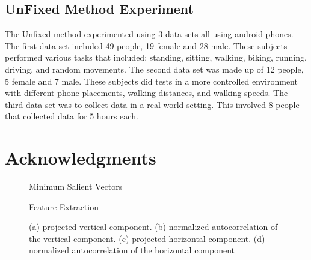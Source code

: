 \documentclass{sig-alternate}
\begin{document}
\subsection{UnFixed Method Experiment}
	The Unfixed method experimented using 3 data sets all using android phones. The first data set included 49 people, 19 female and 28 male. These subjects performed various tasks that included: standing, sitting, walking, biking, running, driving, and random movements. The second data set was made up of 12 people, 5 female and 7 male. These subjects did tests in a more controlled environment with different phone placements, walking distances, and walking speeds. The third data set was to collect data in a real-world setting. This involved 8 people that collected data for 5 hours each. 
\section{Acknowledgments}



  



\begin{figure*}
\centering
{}
\caption{Minimum Salient Vectors}
\label{fig:AccelChart}
\end{figure*}

\begin{figure}
\centering
{}
\caption{Feature Extraction}
\label{fig:SecondStep}
\end{figure}

\begin{figure}
\centering
{}
\caption{(a) projected vertical component. (b) normalized autocorrelation of the vertical component. (c) projected horizontal component. (d) normalized autocorrelation of the horizontal component}
\label{fig:TD1}
\end{figure}
\end{document}
